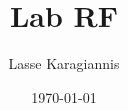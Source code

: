 \documentclass{article}
\title{Lab RF\\}
\author{Lasse Karagiannis}
\date{\today} %
\newcommand\mtotex[2]{\immediate\write18{m4 #2.m4 | dpic -#1 > #2.tex}}
\begin{document}
\begin{titlepage}
\maketitle
\end{titlepage}
\tableofcontents
\vfill\null
\newpage

%



%
\end{document}

